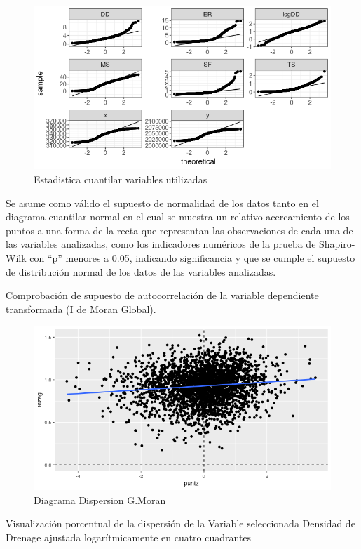 \documentclass[11pt,]{article}
\begin{document}
\begin{figure}
\centering
\includegraphics{Imagenes/pruebanormshapiro.png}
\caption{Estadistica cuantilar variables utilizadas}
\end{figure}

Se asume como válido el supuesto de normalidad de los datos tanto en el
diagrama cuantilar normal en el cual se muestra un relativo acercamiento
de los puntos a una forma de la recta que representan las observaciones
de cada una de las variables analizadas, como los indicadores numéricos
de la prueba de Shapiro-Wilk con ``p'' menores a 0.05, indicando
significancia y que se cumple el supuesto de distribución normal de los
datos de las variables analizadas.

Comprobación de supuesto de autocorrelación de la variable dependiente
transformada (I de Moran Global).

\begin{figure}
\centering
\includegraphics{Imagenes/DiagDisperMoran.png}
\caption{Diagrama Dispersion G.Moran}
\end{figure}

Visualización porcentual de la dispersión de la Variable seleccionada
Densidad de Drenage ajustada logarítmicamente en cuatro cuadrantes
\end{document}
